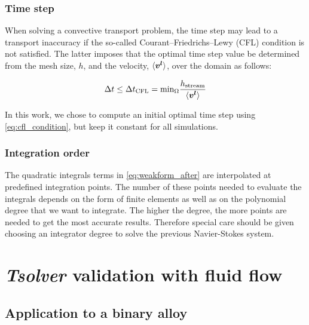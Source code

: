 \subsubsection{Time step}

When solving a convective transport problem, the time step may lead to a transport inaccuracy
if the so-called Courant–Friedrichs–Lewy (CFL) condition is not satisfied. The latter imposes that
the optimal time step value be determined from the mesh size, $h$, and the velocity, $\langle \boldsymbol{v^l} \rangle$, over the domain as follows:

\begin{align}
\label{eq:cfl_condition}
\Delta t \leq \Delta t_\text{CFL} = \text{min}_\Omega \frac{h_\text{stream}}{\langle \boldsymbol{v^l} \rangle}
\end{align}

In this work, we chose to compute an initial optimal time step using \cref{eq:cfl_condition}, but keep it
constant for all simulations.

\subsubsection{Integration order}

The quadratic integrals terms in \cref{eq:weakform_after} are interpolated at predefined integration points.
The number of these points needed to evaluate the integrals depends on the form of finite elements
as well as on the polynomial degree that we want to integrate. The higher the degree, the more points 
are needed to get the most accurate results. Therefore special care should be given choosing an integrator
degree to solve the previous Navier-Stokes system.


\section{\emph{Tsolver} validation with fluid flow}  \label{sec:tsolver_validation}

\subsection{Application to a binary alloy}

